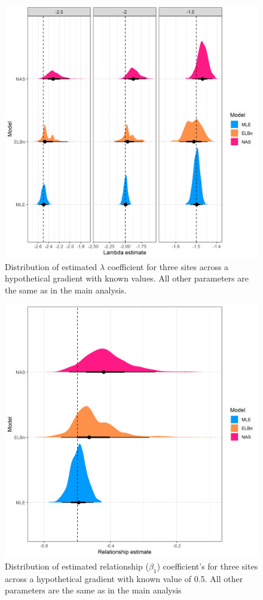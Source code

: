 \documentclass[
]{article}
\begin{document}
\begin{figure}
\centering
\includegraphics{figures/PLB_3_sites_est_b_density.png}
\caption{Distribution of estimated \(\lambda\) coefficient for three
sites across a hypothetical gradient with known values. All other
parameters are the same as in the main analysis.}
\end{figure}

\newpage

\begin{figure}
\centering
\includegraphics{figures/PLB_3_sites_relationship_density.png}
\caption{Distribution of estimated relationship (\(\beta_1\))
coefficient's for three sites across a hypothetical gradient with known
value of 0.5. All other parameters are the same as in the main analysis}
\end{figure}
\end{document}
